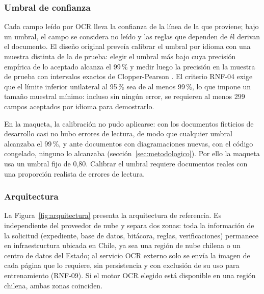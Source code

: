 \documentclass[11pt,a4paper]{article}
\begin{document}
\subsubsection{Umbral de confianza}
\label{sec:umbral}
Cada campo leído por OCR lleva la confianza de la línea de la que proviene; bajo un umbral, el campo se considera no leído y las reglas que dependen de él derivan el documento. El diseño original preveía calibrar el umbral por idioma con una muestra distinta de la de prueba: elegir el umbral más bajo cuya precisión empírica de lo aceptado alcanza el 99\,\% y medir luego la precisión en la muestra de prueba con intervalos exactos de Clopper-Pearson \cite{clopper1934}. El criterio RNF-04 exige que el límite inferior unilateral al 95\,\% sea de al menos 99\,\%, lo que impone un tamaño muestral mínimo: incluso sin ningún error, se requieren al menos 299 campos aceptados por idioma para demostrarlo.

En la maqueta, la calibración no pudo aplicarse: con los documentos ficticios de desarrollo casi no hubo errores de lectura, de modo que cualquier umbral alcanzaba el 99\,\%, y ante documentos con diagramaciones nuevas, con el código congelado, ninguno lo alcanzaba (sección~\ref{sec:metodologico}). Por ello la maqueta usa un umbral fijo de 0,80. Calibrar el umbral requiere documentos reales con una proporción realista de errores de lectura.

\subsubsection{Arquitectura}
La Figura~\ref{fig:arquitectura} presenta la arquitectura de referencia. Es independiente del proveedor de nube y separa dos zonas: toda la información de la solicitud (expediente, base de datos, bitácora, reglas, verificaciones) permanece en infraestructura ubicada en Chile, ya sea una región de nube chilena o un centro de datos del Estado; al servicio OCR externo solo se envía la imagen de cada página que lo requiere, sin persistencia y con exclusión de su uso para entrenamiento (RNF-09). Si el motor OCR elegido está disponible en una región chilena, ambas zonas coinciden.
\end{document}

